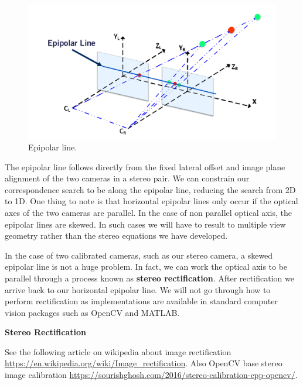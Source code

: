 \begin{figure}[!htb]
\begin{center}
\includegraphics[scale=0.380]{img/visual_perception/epipolar_line.jpeg}
\end{center}
\caption{Epipolar line.}
\label{epipolar_line}
\end{figure}



The epipolar line follows directly from the fixed lateral offset and image plane alignment of the two cameras in a stereo pair. 
We can constrain our correspondence search to be along the epipolar line, reducing the search from 2D to 1D. One thing to note is that
horizontal epipolar lines only occur if the optical axes of the two cameras are parallel. In the case of
non parallel optical axis, the epipolar lines are skewed. In such cases we will
have to result to multiple view geometry rather than the stereo equations we have developed.  

In the case of two calibrated cameras, such as our stereo camera, a skewed epipolar line
is not a huge problem. In fact, we can work the optical axis to be parallel through a process
known as \textbf{stereo rectification}. After rectification we arrive back to our horizontal
epipolar line. We will not go through how to perform rectification
as implementations are available in standard
computer vision packages such as OpenCV and MATLAB. 


\begin{framed}
\begin{remark}{\textbf{Stereo Rectification}}

See the following article on wikipedia about image rectification \url{https://en.wikipedia.org/wiki/Image_rectification}.
Also OpenCV base stereo image calibration \url{https://sourishghosh.com/2016/stereo-calibration-cpp-opencv/}.
\end{remark}
\end{framed}

